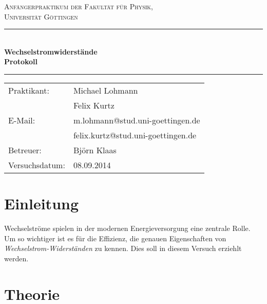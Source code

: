 \documentclass[12pt,a4paper,titlepage,headinclude,bibtotoc]{scrartcl}
\begin{document}
\begin{titlepage}
\centering
\textsc{\Large Anfängerpraktikum der Fakultät für
  Physik,\\[1.5ex] Universität Göttingen}

\vspace*{4.2cm}

\rule{\textwidth}{1pt}\\[0.5cm]
{\huge \bfseries
  Wechselstromwiderstände\\[1.5ex]
  Protokoll}\\[0.5cm]
\rule{\textwidth}{1pt}

\vspace*{2.5cm}

\begin{Large}
\begin{tabular}{ll}
Praktikant: &  Michael Lohmann\\
 &  Felix Kurtz\\
 E-Mail: & m.lohmann@stud.uni-goettingen.de\\
 &  felix.kurtz@stud.uni-goettingen.de\\
 Betreuer: & Björn Klaas\\
 Versuchsdatum: & 08.09.2014\\
\end{tabular}
\end{Large}

\vspace*{0.8cm}

\begin{Large}
\end{Large}

\end{titlepage}

\tableofcontents

\newpage

\section{Einleitung}
\label{sec:einleitung}
Wechselströme spielen in der modernen Energieversorgung eine zentrale Rolle.
Um so wichtiger ist es für die Effizienz, die genauen Eigenschaften von \emph{Wechselstrom-Widerständen} zu kennen.
Dies soll in diesem Versuch erziehlt werden.\cite{LP14}
\section{Theorie}
\label{sec:theorie}
                                                                                                                                                                      
\end{document}
